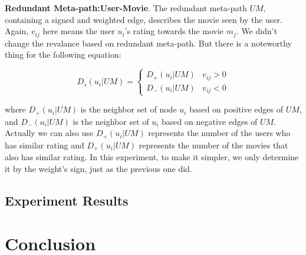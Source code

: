 \documentclass{acm_proc_article-csis8101}
\begin{document}
\textbf{Redundant Meta-path:User-Movie}. The redundant meta-path $UM$, containing a signed and weighted edge, describes the movie seen by the user. Again, $v_{ij}$ here means the user $u_{i}$'s rating towards the movie $m_{j}$. We didn't change the revalance based on redundant meta-path. But there is a noteworthy thing for the following equation:

\begin{equation}
D_{s}(u_{i}|UM)=
\begin{cases}
D_{+}(u_{i}|UM)& v_{ij} > 0 \\
D_{-}(u_{i}|UM)& v_{ij} < 0
\end{cases}
\end{equation}

where $D_{+}(u_{i}|UM)$ is the neighbor set of node $u_{i}$ based on positive edges of $UM$, and $D_{-}(u_{i}|UM)$ is the neighbor set of $u_{i}$ based on negative edges of $UM$. Actually we can also use $D_{+}(u_{i}|UM)$ represents the number of the users who has similar rating and $D_{+}(u_{i}|UM)$ represents the number of the movies that also has similar rating. In this experiment, to make it simpler, we only determine it by the weight's sign, just as the previous one did.

\subsection{Experiment Results}

\section{Conclusion}

\end{document}

